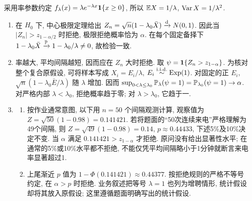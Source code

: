 \begin{solution}
采用率参数约定 $f_\lambda(x)=\lambda e^{-\lambda x}\mathbf 1\{x\ge0\}$, 所以 $\mathbb E X=1/\lambda$, $\operatorname{Var} X=1/\lambda^2$.
\begin{enumerate}[label=\arabic*.]
\item 在 $H_0$ 下, 中心极限定理给出 $Z_n=\sqrt n(1-\lambda_0\bar X)\xrightarrow{\mathrm d} N(0,1)$. 因此当 $|Z_n|>z_{1-\alpha/2}$ 时拒绝, 极限拒绝概率恰为 $\alpha$. 在每个固定备择下 $1-\lambda_0\bar X\xrightarrow{\mathbb P}1-\lambda_0/\lambda\ne0$, 故检验一致.
\item 率越大, 平均间隔越短, 因而应在 $Z_n$ 大时拒绝. 取 $\psi=\mathbf 1\{Z_n>z_{1-\alpha}\}$. 为核对整个复合原假设, 可将样本写成 $X_i=E_i/\lambda$, $E_i\stackrel{\mathrm{i.i.d.}}{\sim}\operatorname{Exp}(1)$. 对固定的正 $E_i$, $\sqrt n(1-\lambda_0\bar E/\lambda)$ 随 $\lambda$ 增加. 因而 $\sup_{0<\lambda\le\lambda_0}\mathbb P_\lambda(\psi=1)=\mathbb P_{\lambda_0}(\psi=1)\to\alpha$. 对严格内部 $\lambda<\lambda_0$, 拒绝概率趋于零; 对 $\lambda>\lambda_0$, 它趋于一.
\item
\begin{enumerate}[label=\alph*)]
\item 按作业通常意图, 以下用 $n=50$ 个间隔观测计算, 观察值为 $Z=\sqrt{50}(1-0.98)=0.141421$. 若将题面的“50次连续来电”严格理解为49个间隔, 则 $Z=\sqrt{49}(1-0.98)=0.14$, $p\approx0.44433$, 下述5\%及10\%决定不变. 当 $\alpha$ 满足 $0.141421>z_{1-\alpha}$ 才拒绝. 原问没有给出显著性水平; 在通常的5\%或10\%水平都不拒绝, 不能仅凭平均间隔略小于1分钟就断言来电率显著超过1.
\item 上尾渐近 $p$ 值为 $1-\Phi(0.141421)\approx0.44377$. 按拒绝规则的严格不等号约定, 在 $\alpha>p$ 时拒绝. 业务叙述把等号 $\lambda=1$ 也列为增聘情形, 统计假设却将其放入原假设; 这里遵循题面明确写出的统计假设.
\end{enumerate}
\end{enumerate}
\end{solution}

